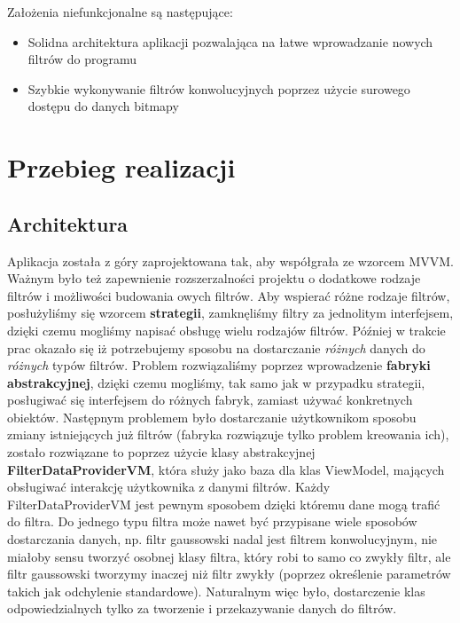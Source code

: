 \documentclass{article}
\begin{document}
Założenia niefunkcjonalne są następujące:
\begin{itemize}
    \item Solidna architektura aplikacji pozwalająca na łatwe wprowadzanie nowych filtrów do programu
    \item Szybkie wykonywanie filtrów konwolucyjnych poprzez użycie surowego dostępu do danych bitmapy
\end{itemize}


\section{Przebieg realizacji}

\subsection{Architektura}
Aplikacja została z góry zaprojektowana tak, aby współgrała ze wzorcem MVVM. Ważnym było też zapewnienie rozszerzalności projektu o dodatkowe rodzaje filtrów i 
możliwości budowania owych filtrów. Aby wspierać różne rodzaje filtrów, posłużyliśmy się wzorcem \textbf{strategii}, zamknęliśmy filtry za jednolitym interfejsem, dzięki czemu
mogliśmy napisać obsługę wielu rodzajów filtrów. Później w trakcie prac okazało się iż potrzebujemy sposobu na dostarczanie \textit{różnych} danych do \textit{różnych} typów filtrów.
Problem rozwiązaliśmy poprzez wprowadzenie \textbf{fabryki abstrakcyjnej}, dzięki czemu mogliśmy, tak samo jak w przypadku strategii, posługiwać się interfejsem
do różnych fabryk, zamiast używać konkretnych obiektów. Następnym problemem było dostarczanie użytkownikom sposobu zmiany istniejących już filtrów (fabryka rozwiązuje tylko problem kreowania ich),
zostało rozwiązane to poprzez użycie klasy abstrakcyjnej \textbf{FilterDataProviderVM}, która służy jako baza dla klas ViewModel, mających obsługiwać interakcję użytkownika z 
danymi filtrów. Każdy FilterDataProviderVM jest pewnym sposobem dzięki któremu dane mogą trafić do filtra. Do jednego typu filtra może nawet być przypisane wiele
sposobów dostarczania danych, np. filtr gaussowski nadal jest filtrem konwolucyjnym, nie miałoby sensu tworzyć osobnej klasy filtra, który robi to samo co zwykły
filtr, ale filtr gaussowski tworzymy inaczej niż filtr zwykły (poprzez określenie parametrów takich jak odchylenie standardowe). Naturalnym więc było, dostarczenie klas
odpowiedzialnych tylko za tworzenie i przekazywanie danych do filtrów.
\end{document}
